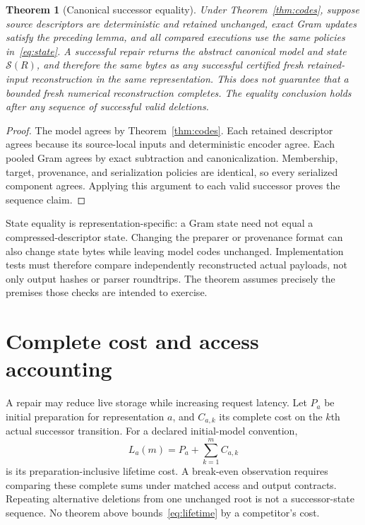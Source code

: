 \documentclass[10pt,twocolumn,letterpaper]{article}
\newtheorem{theorem}{Theorem}
\newcommand{\calS}{\mathcal{S}}
\begin{document}
\begin{theorem}[Canonical successor equality]
\label{thm:state}
Under Theorem~\ref{thm:codes}, suppose source descriptors are deterministic and
retained unchanged, exact Gram updates satisfy the preceding lemma, and all
compared executions use the same policies in~\eqref{eq:state}. A successful repair
returns the abstract canonical model and state $\calS(R)$, and therefore the same
bytes as any successful certified fresh retained-input reconstruction in the
same representation. This does not guarantee that a bounded fresh numerical
reconstruction completes. The equality conclusion holds after any
sequence of successful valid deletions.
\end{theorem}
\begin{proof}
The model agrees by Theorem~\ref{thm:codes}. Each retained descriptor agrees because
its source-local inputs and deterministic encoder agree. Each pooled Gram agrees
by exact subtraction and canonicalization. Membership, target, provenance, and
serialization policies are identical, so every serialized component agrees.
Applying this argument to each valid successor proves the sequence claim.
\end{proof}

State equality is representation-specific: a Gram state need not equal a
compressed-descriptor state. Changing the preparer or provenance format can also
change state bytes while leaving model codes unchanged. Implementation tests must
therefore compare independently reconstructed actual payloads, not only output
hashes or parser roundtrips. The theorem assumes precisely the premises those
checks are intended to exercise.

\section{Complete cost and access accounting}
A repair may reduce live storage while increasing request latency. Let $P_a$ be
initial preparation for representation $a$, and $C_{a,k}$ its complete cost on the
$k$th actual successor transition. For a declared initial-model convention,
\begin{equation}
 L_a(m)=P_a+\sum_{k=1}^{m}C_{a,k}
 \label{eq:lifetime}
\end{equation}
is its preparation-inclusive lifetime cost. A break-even observation requires
comparing these complete sums under matched access and output contracts. Repeating
alternative deletions from one unchanged root is not a successor-state sequence.
No theorem above bounds~\eqref{eq:lifetime} by a competitor's cost.
\end{document}
